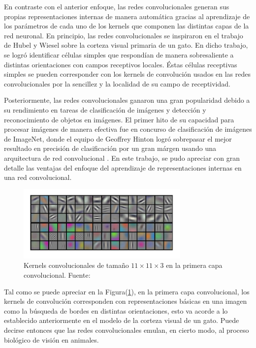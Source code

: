         En contraste con el anterior enfoque, las redes convolucionales generan sus propias representaciones internas
        de manera automática gracias al aprendizaje de los parámetros de cada uno de los kernels que componen las distintas 
        capas de la red neuronal. En principio, las redes convolucionales se inspiraron en el trabajo de Hubel y Wiesel 
        sobre la corteza visual primaria de un gato\cite{lecun2010convolutional}. En dicho trabajo, se logró identificar células simples que respondían
        de manera sobresaliente a distintas orientaciones con campos receptivos locales. Éstas células receptivas simples 
        se pueden corresponder con los kernels de convolución usados en las redes convolucionales por la sencillez y la 
        localidad de su campo de receptividad.

        Posteriormente, las redes convolucionales ganaron una gran popularidad debido a su rendimiento en tareas de 
        clasificación de imágenes y detección y reconocimiento de objetos en imágenes. El primer hito de su capacidad 
        para procesar imágenes de manera efectiva fue en concurso de clasificación de imágenes de ImageNet, donde 
        el equipo de Geoffrey Hinton logró sobrepasar el mejor resultado en precisión de clasificación por un gran márgen 
        usando una arquitectura de red convolucional \cite{krizhevsky2012imagenet}. En este trabajo, se pudo apreciar con 
        gran detalle las ventajas del enfoque del aprendizaje de representaciones internas en una red convolucional.

        \begin{figure}[!h] 
            \centering
            \includegraphics[width=0.75\textwidth]{img/fmap_imagenet}
            \caption[Kernels convolucionales de tamaño]{Kernels convolucionales de tamaño $11 \times 11 \times 3$ en la primera capa convolucional. Fuente: \cite{krizhevsky2012imagenet} }
            \label{fig:fmap_imagenet}
        \end{figure}
            
        Tal como se puede apreciar en la Figura(\ref{fig:fmap_imagenet}), en la primera capa convolucional, 
        los kernels de convolución corresponden con representaciones básicas en una imagen como la búsqueda de 
        bordes en distintas orientaciones, esto va acorde a lo establecido anteriormente en el modelo de 
        la corteza visual de un gato. Puede decirse entonces que las redes convolucionales emulan, en cierto modo, 
        al proceso biológico de visión en animales.

